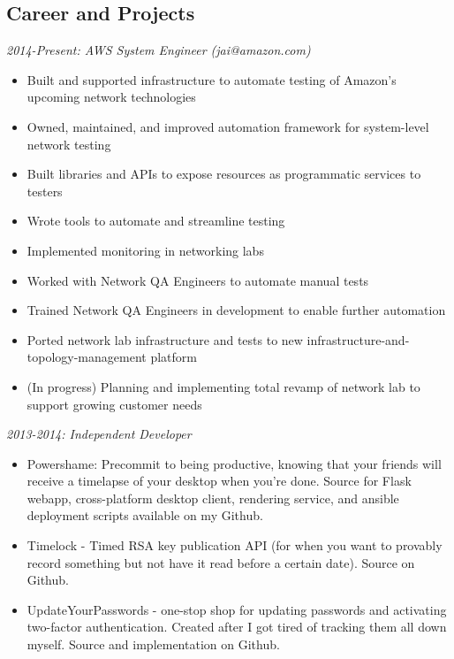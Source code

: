 \documentclass[line]{res} %
\begin{document}
\address{jai@jaibot.com - http://jaibot.com - 609 948 4264 (email strongly preferred)}
\begin{resume}
\section{Career and Projects} 

{\sl 2014-Present: AWS System Engineer (jai@amazon.com)}
    \begin{itemize} 
        \item Built and supported infrastructure to automate testing of Amazon's upcoming network technologies
        \item Owned, maintained, and improved automation framework for system-level network testing
        \item Built libraries and APIs to expose resources as programmatic services to testers
        \item Wrote tools to automate and streamline testing
        \item Implemented monitoring in networking labs
        \item Worked with Network QA Engineers to automate manual tests
        \item Trained Network QA Engineers in development to enable further automation
        \item Ported network lab infrastructure and tests to new infrastructure-and-topology-management platform
        \item (In progress) Planning and implementing total revamp of network lab to support growing customer needs
    \end{itemize}

{\sl 2013-2014: Independent Developer }
    \begin{itemize} 
        \item Powershame: Precommit to being productive, knowing that your friends will receive a timelapse of your desktop when you're done. Source for Flask webapp, cross-platform desktop client, rendering service, and ansible deployment scripts available on my Github.
    \item Timelock - Timed RSA key publication API (for when you want to provably record something but not have it read before a certain date). Source on Github.
    \item UpdateYourPasswords - one-stop shop for updating passwords and activating two-factor authentication. Created after I got tired of tracking them all down myself. Source and implementation on Github.
    \end{itemize}



\end{resume}
\end{document}
